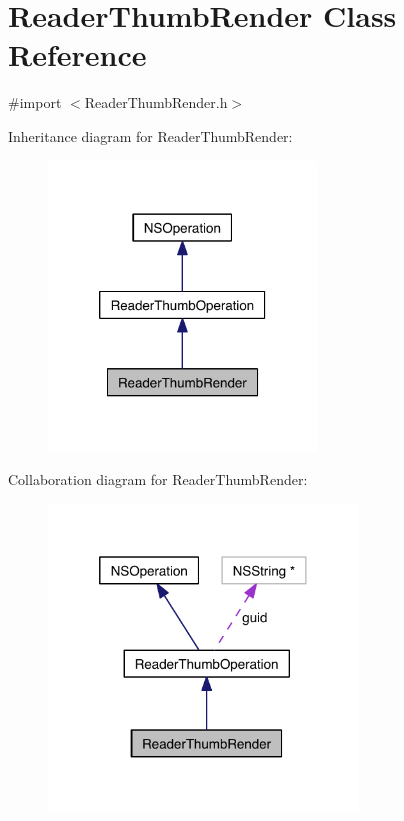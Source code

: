 \hypertarget{interface_reader_thumb_render}{\section{Reader\-Thumb\-Render Class Reference}
\label{d1/dcd/interface_reader_thumb_render}
}


{\ttfamily \#import $<$Reader\-Thumb\-Render.\-h$>$}



Inheritance diagram for Reader\-Thumb\-Render\-:
\nopagebreak
\begin{figure}[H]
\begin{center}
\leavevmode
\includegraphics[width=202pt]{dd/d3b/interface_reader_thumb_render__inherit__graph}
\end{center}
\end{figure}


Collaboration diagram for Reader\-Thumb\-Render\-:
\nopagebreak
\begin{figure}[H]
\begin{center}
\leavevmode
\includegraphics[width=233pt]{db/d5c/interface_reader_thumb_render__coll__graph}
\end{center}
\end{figure}
